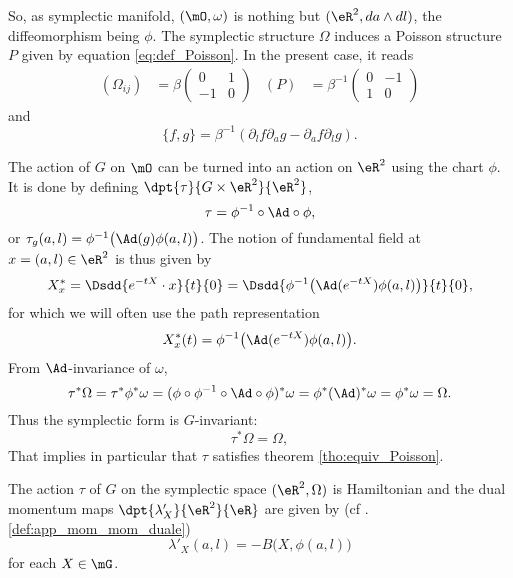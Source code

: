 So, as symplectic manifold, $(\mO,\omega)$ is nothing but $(\eR^2,da\wedge dl)$, the diffeomorphism being $\phi$. The symplectic structure $\Omega$ induces a Poisson structure $P$ given by equation \eqref{eq:def_Poisson}. In the present case, it reads
\begin{align}
(\Omega_{ij})&=\beta\begin{pmatrix}
0 & 1 \\
-1 & 0
\end{pmatrix}
&(P)&=\beta^{-1}\begin{pmatrix}
0 & -1 \\
1 & 0
\end{pmatrix}
\end{align}
 and
\begin{equation}\label{eq:Poisson}
  \{f,g\}=\beta^{-1}(\partial_lf\partial_ag-\partial_af\partial_lg).
\end{equation}

The action of $G$ on $\mO$ can be turned into an action on $\eR^2$ using the chart $\phi$. It is done by defining $\dpt{\tau}{G\times\eR^2}{\eR^2}$,
\begin{equation}
   \tau=\phi^{-1}\circ \Ad\circ\phi,
\end{equation}
or $\tau_g(a,l)=\phi^{-1}\big( \Ad(g)\phi(a,l)\big)$.  The notion of fundamental field at $x=(a,l)\in\eR^2$ is thus given by
\begin{equation}
  X^*_x=\Dsdd{e^{-tX}\cdot x}{t}{0}
       =\Dsdd{ \phi^{-1}\big( \Ad(e^{-tX})\phi(a,l)  \big) }{t}{0},
\end{equation}
for which we will often use the path representation
\[
   X^*_x(t)=\phi^{-1}\big( \Ad(e^{-tX})\phi(a,l)  \big).
\]
From $\Ad$-invariance of $\omega$,
\[
   \tau^*\Omega=\tau^*\phi^*\omega
               =(\phi\circ\phi^{-1}\circ \Ad\circ\phi)^*\omega
	       =\phi^*(\Ad)^*\omega
	       =\phi^*\omega
	       =\Omega.
\]
Thus the symplectic form is $G$-invariant:
\begin{equation}     \label{eq:tau_s_Omega}
  \tau^*\Omega=\Omega,
\end{equation}
That implies in particular that $\tau$ satisfies theorem \ref{tho:equiv_Poisson}.

\begin{proposition}
The action $\tau$ of $G$ on the symplectic space $(\eR^2,\Omega)$ is Hamiltonian and the dual momentum maps $\dpt{\lambda'_X}{\eR^2}{\eR}$ are given by (cf .\ref{def:app_mom_mom_duale})
\begin{equation}
  \lambda'_X(a,l)=-B\big(X,\phi(a,l)\big)
\end{equation}
for each $X\in\mG$.
\label{prop:lambda_X}
\end{proposition}

